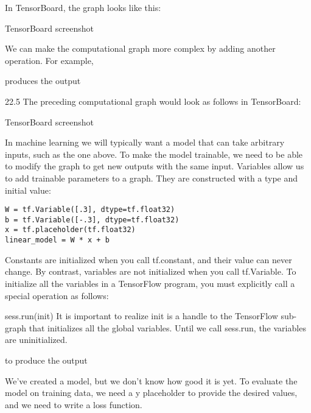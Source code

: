 In TensorBoard, the graph looks like this:

TensorBoard screenshot

We can make the computational graph more complex by adding another operation. For example,

produces the output

22.5
The preceding computational graph would look as follows in TensorBoard:

TensorBoard screenshot

In machine learning we will typically want a model that can take arbitrary inputs, such as the one above. To make the model trainable, we need to be able to modify the graph to get new outputs with the same input. Variables allow us to add trainable parameters to a graph. They are constructed with a type and initial value:

\begin{verbatim}
W = tf.Variable([.3], dtype=tf.float32)
b = tf.Variable([-.3], dtype=tf.float32)
x = tf.placeholder(tf.float32)
linear_model = W * x + b
\end{verbatim}
Constants are initialized when you call tf.constant, and their value can never change. By contrast, variables are not initialized when you call tf.Variable. To initialize all the variables in a TensorFlow program, you must explicitly call a special operation as follows:

sess.run(init)
It is important to realize init is a handle to the TensorFlow sub-graph that initializes all the global variables. Until we call sess.run, the variables are uninitialized.


to produce the output

We've created a model, but we don't know how good it is yet. To evaluate the model on training data, we need a y placeholder to provide the desired values, and we need to write a loss function.


